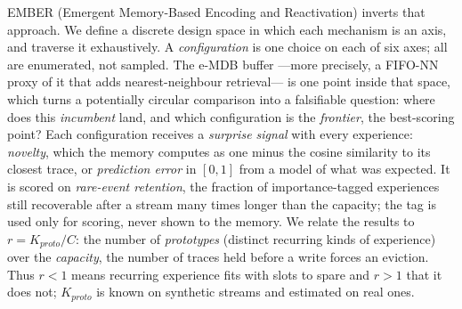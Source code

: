 \documentclass[conference]{IEEEtran}
\begin{document}
EMBER (Emergent Memory-Based Encoding and Reactivation) inverts that approach.
We define a discrete design space in which each mechanism is an axis, and
traverse it exhaustively. A \emph{configuration} is one choice on each of six
axes; all  are enumerated, not
sampled. The e-MDB buffer ---more precisely, a FIFO-NN proxy of it that adds
nearest-neighbour retrieval--- is one point inside that space, which turns a
potentially circular comparison into a falsifiable question: where does this
\emph{incumbent} land, and which configuration is the \emph{frontier}, the
best-scoring point? Each configuration receives a \emph{surprise signal} with
every experience: \emph{novelty}, which the memory computes as one minus the
cosine similarity to its closest trace, or \emph{prediction error} in $[0,1]$
from a model of what was expected. It is scored on \emph{rare-event
retention}, the fraction of importance-tagged experiences still recoverable
after a stream many times longer than the capacity; the tag is used only for
scoring, never shown to the memory. We relate the results to
$r = K_{proto}/C$: the number of \emph{prototypes} (distinct recurring kinds of
experience) over the \emph{capacity}, the number of traces held before a write
forces an eviction. Thus $r<1$ means recurring experience fits with slots to
spare and $r>1$ that it does not; $K_{proto}$ is known on synthetic streams and
estimated on real ones.
\end{document}
